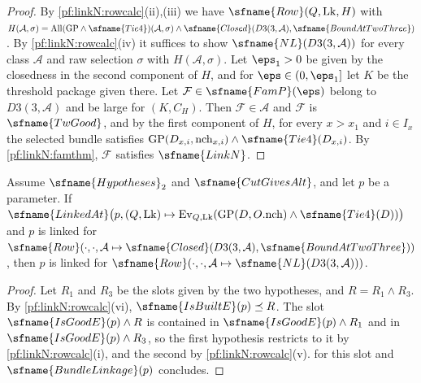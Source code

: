 \begin{proof}
By \cref{pf:linkN:rowcalc}(ii),(iii) we have $\sfname{Row}(Q,\mathrm{Lk},H)$ with
$H(\mathcal A,\sigma)=\mathrm{All}(\mathrm{GP}\wedge\sfname{Tie4})(\mathcal A,\sigma)\wedge\sfname{Closed}(D3(3,\mathcal A),\sfname{BoundAtTwoThree})$.
By \cref{pf:linkN:rowcalc}(iv) it suffices to show $\sfname{NL}(D3(3,\mathcal A))$ for every class $\mathcal A$ and raw selection
$\sigma$ with $H(\mathcal A,\sigma)$. Let $\eps_1>0$ be given by the closedness in the second component of $H$, and for
$\eps\in(0,\eps_1]$ let $K$ be the threshold package given there. Let $\mathcal F\in\sfname{FamP}(\eps)$ belong to $D3(3,\mathcal A)$
and be large for $(K,C_H)$. Then $\mathcal F\in\mathcal A$ and $\mathcal F$ is $\sfname{TwGood}$, and by the first component of $H$,
for every $x>x_1$ and $i\in I_x$ the selected bundle satisfies $\mathrm{GP}(D_{x,i},\mathrm{nch}_{x,i})\wedge\sfname{Tie4}(D_{x,i})$. By
\cref{pf:linkN:famthm}, $\mathcal F$ satisfies $\sfname{LinkN}$.
\end{proof}

\begin{proposition}[Linkedness]\label{pf:linkN:linkedAt}
Assume $\sfname{Hypotheses}_2$ and $\sfname{CutGivesAlt}$, and let $p$ be a parameter. If
$\sfname{LinkedAt}\bigl(p,(Q,\mathrm{Lk})\mapsto\mathrm{Ev}_{Q,\mathrm{Lk}}(\mathrm{GP}(D,O.\mathrm{nch})\wedge\sfname{Tie4}(D))\bigr)$ and
$p$ is linked for $\sfname{Row}(\cdot,\cdot,\mathcal A\mapsto\sfname{Closed}(D3(3,\mathcal A),\sfname{BoundAtTwoThree}))$, then $p$ is
linked for $\sfname{Row}(\cdot,\cdot,\mathcal A\mapsto\sfname{NL}(D3(3,\mathcal A)))$.
\end{proposition}

\begin{proof}
Let $R_1$ and $R_3$ be the slots given by the two hypotheses, and $R=R_1\wedge R_3$. By \cref{pf:linkN:rowcalc}(vi),
$\sfname{IsBuiltE}(p)\preceq R$. The slot $\sfname{IsGoodE}(p)\wedge R$ is contained in $\sfname{IsGoodE}(p)\wedge R_1$ and in
$\sfname{IsGoodE}(p)\wedge R_3$, so the first hypothesis restricts to it by \cref{pf:linkN:rowcalc}(i), and the second by
\cref{pf:linkN:rowcalc}(v).  for this slot and $\sfname{BundleLinkage}(p)$ concludes.
\end{proof}

